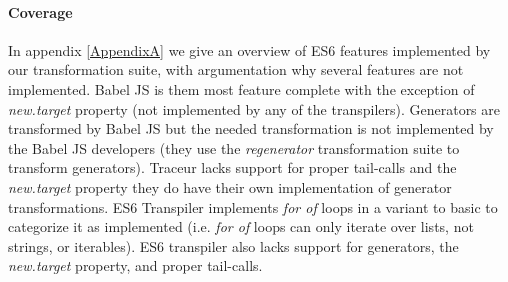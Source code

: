 \paragraph{Coverage}
In appendix \ref{AppendixA} we give an overview of ES6 features implemented by our transformation suite, with argumentation why several features are not implemented. Babel JS is them most feature complete with the exception of \textit{new.target} property (not implemented by any of the transpilers). Generators are transformed by Babel JS but the needed transformation is not implemented by the Babel JS developers (they use the \textit{regenerator} transformation suite to transform generators). Traceur lacks support for proper tail-calls and the \textit{new.target} property they do have their own implementation of generator transformations. ES6 Transpiler implements \textit{for of} loops in a variant to basic to categorize it as implemented (i.e. \textit{for of} loops can only iterate over lists, not strings, or iterables). ES6 transpiler also lacks support for generators, the \textit{new.target} property, and proper tail-calls.

